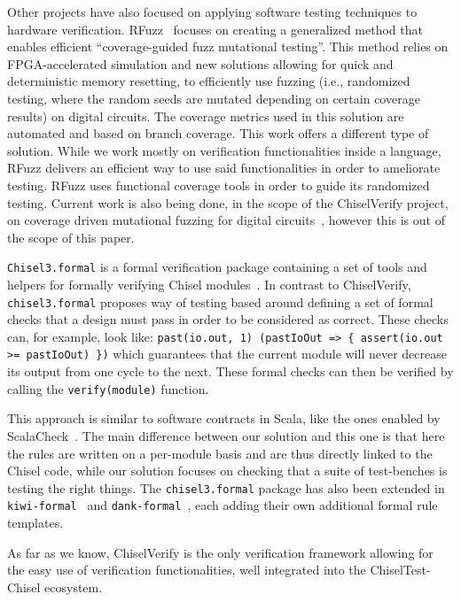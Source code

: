 \documentclass[conference]{IEEEtran}
\begin{document}
Other projects have also focused on applying software testing techniques to hardware verification. 
RFuzz~\cite{rfuzz2018} focuses on creating a generalized method that enables efficient ``coverage-guided fuzz mutational testing''. 
This method relies on FPGA-accelerated simulation and new solutions allowing for quick and deterministic memory resetting, to efficiently use fuzzing (i.e., randomized testing, where the random seeds are mutated depending on certain coverage results) on digital circuits. 
The coverage metrics used in this solution are automated and based on branch coverage. 
This work offers a different type of solution. 
While we work mostly on verification functionalities inside a language, RFuzz delivers an efficient way to use said functionalities in order to ameliorate testing. 
RFuzz uses functional coverage tools in order to guide its randomized testing. 
Current work is also being done, in the scope of the ChiselVerify project, on coverage driven mutational fuzzing for digital circuits~\cite{verify:fuzzing:2021}, however this is out of the scope of this paper.

\texttt{Chisel3.formal}  is a formal verification package containing a set of tools and helpers for formally verifying Chisel modules~\cite{chisel:formal}. 
In contrast to ChiselVerify, \texttt{chisel3.formal} proposes way of testing based around defining a set of formal checks that a design must pass in order to be considered as correct. 
These checks can, for example, look like: \texttt{past(io.out, 1) (pastIoOut => \{ assert(io.out >= pastIoOut) \})} which guarantees that the current module will never decrease its output from one cycle to the next. 
These formal checks can then be verified by calling the \texttt{verify(module)} function. 

This approach is similar to software contracts in Scala, like the ones enabled by ScalaCheck~\cite{scalacheck}. 
The main difference between our solution and this one is that here the rules are written on a per-module basis and are thus directly linked to the Chisel code, while our solution focuses on checking that a suite of test-benches is testing the right things. 
The \texttt{chisel3.formal} package has also been extended in \texttt{kiwi-formal}~\cite{chisel:kiwi-formal} and \texttt{dank-formal}~\cite{chisel:dank-formal}, each adding their own additional formal rule templates. 

As far as we know, ChiselVerify is the only verification framework allowing for the easy use of verification functionalities, well integrated into the ChiselTest-Chisel ecosystem.
\end{document}
